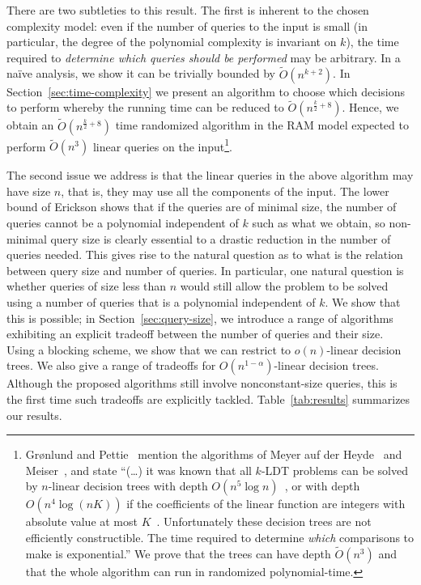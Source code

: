 There are two subtleties to this result. The first is inherent to the chosen
complexity model: even if the number of queries to the input is small (in
particular, the degree of the polynomial complexity is invariant on $k$), the
time required to \emph{determine which queries should be performed} may be
arbitrary. In a na\"ive analysis, we show it can be trivially bounded by
$\tilde{O}(n^{k+2})$. In Section~\ref{sec:time-complexity} we present an algorithm to
choose
which decisions to perform whereby the running time can be reduced to
$\tilde{O}(n^{\frac{k}{2}+8})$. Hence, we obtain an
$\tilde{O}(n^{\frac{k}{2}+8})$ time randomized algorithm in the RAM model
expected to perform $\tilde{O}(n^3)$ linear queries on the input\footnote{%
	Gr{\o}nlund and
	Pettie~\cite{GP14} mention the algorithms of Meyer auf der Heyde~\cite{M84} and
	Meiser~\cite{M93}, and state ``(\ldots) it was known that all \(k\)-LDT problems
	can be solved by $n$-linear decision trees with depth $O(n^5\log
	n)$~\cite{M93}, or with depth $O(n^4\log (nK))$ if the coefficients of the
	linear function are integers with absolute value at most $K$~\cite{M84}.
	Unfortunately these decision trees are not efficiently constructible. The
	time required to determine \emph{which} comparisons to make is
	exponential.'' We prove that the trees can have depth $\tilde{O}(n^3)$ and
	that the whole algorithm can run in randomized polynomial-time.}.

The second issue we address is that the linear queries in the above algorithm may
have size $n$, that is, they may use all the components of the input.
The lower bound of Erickson shows that if the queries are of minimal size, the number
of queries cannot be a polynomial independent of $k$ such as what we obtain, so
non-minimal query size is clearly essential to a drastic reduction in the number of queries needed.
This gives rise to the natural question as to what is the relation between query size and number of queries.
In particular, one natural question is whether queries of size less than $n$
would still allow the problem to be solved using a number of queries that is a
polynomial independent of $k$. We show that this is possible; in Section~\ref{sec:query-size},
we introduce a range of
algorithms exhibiting an explicit tradeoff between the number of queries and
their size. Using a blocking scheme, we show that we can restrict to
$o(n)$-linear decision trees. We also give a
range of tradeoffs for $O(n^{1-\alpha})$-linear decision trees. Although the
proposed algorithms still involve nonconstant-size queries, this is
the first time such tradeoffs are explicitly tackled. Table~\ref{tab:results} summarizes our results.

